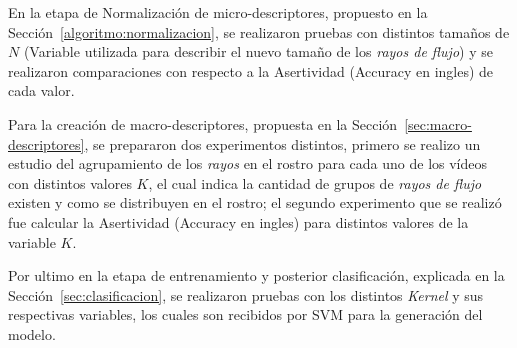 En la etapa de Normalización de micro-descriptores, propuesto en la Sección~\ref{algoritmo:normalizacion}, se realizaron pruebas con distintos tamaños de $N$ (Variable utilizada para describir el nuevo tamaño de los \textit{rayos de flujo}) y se realizaron comparaciones con respecto a la Asertividad (Accuracy en ingles) de cada valor.

Para la creación de macro-descriptores, propuesta en la Sección~\ref{sec:macro-descriptores}, se prepararon dos experimentos distintos, primero se realizo un estudio del agrupamiento de los \textit{rayos} en el rostro para cada uno de los vídeos con distintos valores $K$, el cual indica la cantidad de grupos de \textit{rayos de flujo} existen y como se distribuyen en el rostro; el segundo experimento que se realizó fue calcular la Asertividad (Accuracy en ingles) para distintos valores de la variable $K$.

Por ultimo en la etapa de entrenamiento y posterior clasificación, explicada en la Sección~\ref{sec:clasificacion}, se realizaron pruebas con los distintos \textit{Kernel} y sus respectivas variables, los cuales son recibidos por SVM para la generación del modelo.


